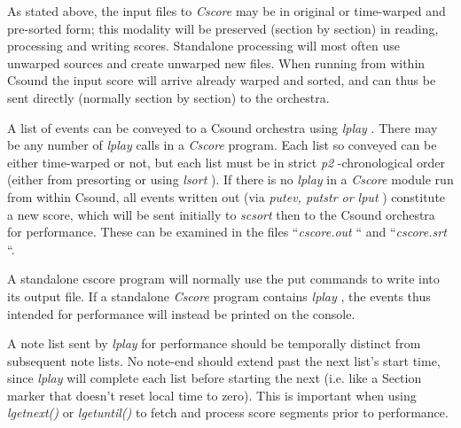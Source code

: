  


  As stated above, the input files to \emph{Cscore}
 may be in original or time-warped and pre-sorted form; this modality will be preserved (section by section) in reading, processing and writing scores. Standalone processing will most often use unwarped sources and create unwarped new files. When running from within Csound the input score will arrive already warped and sorted, and can thus be sent directly (normally section by section) to the orchestra. 


  A list of events can be conveyed to a Csound\emph{ }
orchestra using \emph{lplay}
. There may be any number of \emph{lplay }
calls in a \emph{Cscore}
 program. Each list so conveyed can be either time-warped or not, but each list must be in strict \emph{p2}
-chronological order (either from presorting or using \emph{lsort}
). If there is no \emph{lplay}
 in a \emph{Cscore}
 module run from within Csound, all events written out (via \emph{putev, putstr or lput}
) constitute a new score, which will be sent initially to \emph{scsort}
 then to the Csound\emph{ }
orchestra for performance. These can be examined in the files ``\emph{cscore.out}
`` and ``\emph{cscore.srt}
``. 


  A standalone cscore program will normally use the put commands to write into its output file. If a standalone \emph{Cscore}
 program contains \emph{lplay}
, the events thus intended for performance will instead be printed on the console. 


  A note list sent by \emph{lplay}
 for performance should be temporally distinct from subsequent note lists. No note-end should extend past the next list's start time, since \emph{lplay}
 will complete each list before starting the next (i.e. like a Section marker that doesn't reset local time to zero). This is important when using \emph{lgetnext()}
 or \emph{lgetuntil()}
to fetch and process score segments prior to performance. 


\begin{comment}
\begin{tabular}{lcr}
Previous &Home &Next \\
Writing a Main Program &Up &Compiling a Cscore Program

\end{tabular}



\end{comment}
